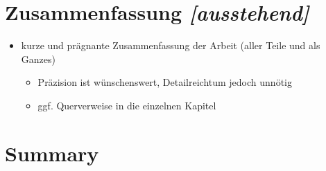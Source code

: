 \documentclass[../main/thesis.tex]{subfiles}
\begin{document}
\chapter{Zusammenfassung \emph{[ausstehend]}}

\begin{itemize}
	\item kurze und prägnante Zusammenfassung der Arbeit (aller Teile und als Ganzes)
	\begin{itemize}
		\item Präzision ist wünschenswert, Detailreichtum jedoch unnötig
		\item ggf. Querverweise in die einzelnen Kapitel
	\end{itemize}
\end{itemize}


\chapter*{Summary}



\end{document}
